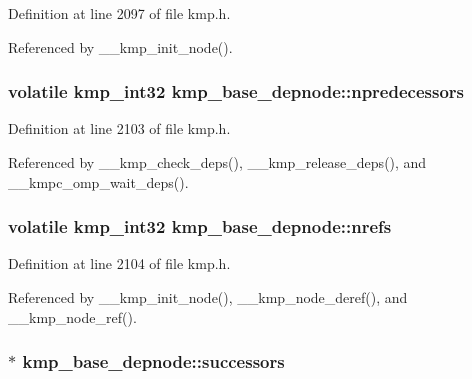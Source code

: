 Definition at line 2097 of file kmp.\-h.



Referenced by \-\_\-\-\_\-kmp\-\_\-init\-\_\-node().

\hypertarget{structkmp__base__depnode_a1b12c30275179b5b16a90959858f2969}{
\subsubsection[{npredecessors}]{\setlength{\rightskip}{0pt plus 5cm}volatile kmp\-\_\-int32 kmp\-\_\-base\-\_\-depnode\-::npredecessors}}\label{structkmp__base__depnode_a1b12c30275179b5b16a90959858f2969}


Definition at line 2103 of file kmp.\-h.



Referenced by \-\_\-\-\_\-kmp\-\_\-check\-\_\-deps(), \-\_\-\-\_\-kmp\-\_\-release\-\_\-deps(), and \-\_\-\-\_\-kmpc\-\_\-omp\-\_\-wait\-\_\-deps().

\hypertarget{structkmp__base__depnode_a03def393dd90934e18d8d64491919f5e}{
\subsubsection[{nrefs}]{\setlength{\rightskip}{0pt plus 5cm}volatile kmp\-\_\-int32 kmp\-\_\-base\-\_\-depnode\-::nrefs}}\label{structkmp__base__depnode_a03def393dd90934e18d8d64491919f5e}


Definition at line 2104 of file kmp.\-h.



Referenced by \-\_\-\-\_\-kmp\-\_\-init\-\_\-node(), \-\_\-\-\_\-kmp\-\_\-node\-\_\-deref(), and \-\_\-\-\_\-kmp\-\_\-node\-\_\-ref().

\hypertarget{structkmp__base__depnode_afdece27522eff7b332a209348f2f85e4}{
\subsubsection[{successors}]{$\ast$ kmp\-\_\-base\-\_\-depnode\-::successors}}\label{structkmp__base__depnode_afdece27522eff7b332a209348f2f85e4}


